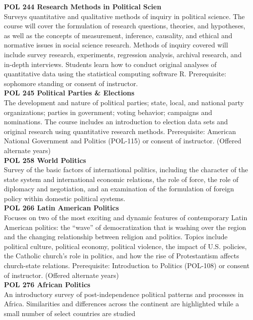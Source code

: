 \documentclass[
  letterpaper,
]{scrbook}
\begin{document}
\textbf{POL 244 Research Methods in Political Scien}\\
Surveys quantitative and qualitative methods of inquiry in political
science. The course will cover the formulation of research questions,
theories, and hypotheses, as well as the concepts of measurement,
inference, causality, and ethical and normative issues in social science
research. Methods of inquiry covered will include survey research,
experiments, regression analysis, archival research, and in-depth
interviews. Students learn how to conduct original analyses of
quantitative data using the statistical computing software R.
Prerequisite: sophomore standing or consent of instructor.\\
\textbf{POL 245 Political Parties \& Elections}\\
The development and nature of political parties; state, local, and
national party organizations; parties in government; voting behavior;
campaigns and nominations. The course includes an introduction to
election data sets and original research using quantitative research
methods. Prerequisite: American National Government and Politics
(POL-115) or consent of instructor. (Offered alternate years)\\
\textbf{POL 258 World Politics}\\
Survey of the basic factors of international politics, including the
character of the state system and international economic relations, the
role of force, the role of diplomacy and negotiation, and an examination
of the formulation of foreign policy within domestic political
systems.\\
\textbf{POL 266 Latin American Politics}\\
Focuses on two of the most exciting and dynamic features of contemporary
Latin American politics: the ``wave'' of democratization that is washing
over the region and the changing relationship between religion and
politics. Topics include political culture, political economy, political
violence, the impact of U.S. policies, the Catholic church's role in
politics, and how the rise of Protestantism affects church-state
relations. Prerequisite: Introduction to Politics (POL-108) or consent
of instructor. (Offered alternate years)\\
\textbf{POL 276 African Politics}\\
An introductory survey of post-independence political patterns and
processes in Africa. Similarities and differences across the continent
are highlighted while a small number of select countries are studied
\end{document}
